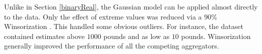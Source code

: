 \documentclass[11pt]{article}
\theoremstyle{definition}
\theoremstyle{definition}
\begin{document}

Unlike in Section  \ref{binaryReal}, the Gaussian model can be applied almost directly to the data. 
Only the effect of extreme values was reduced via a $90$\% Winsorization \citep{hastings1947low}. This handled some obvious outliers. For instance, the dataset contained estimates above $1000$ pounds and as low as $10$ pounds.  Winsorization generally improved the performance of all the competing aggregators.




\end{document}

